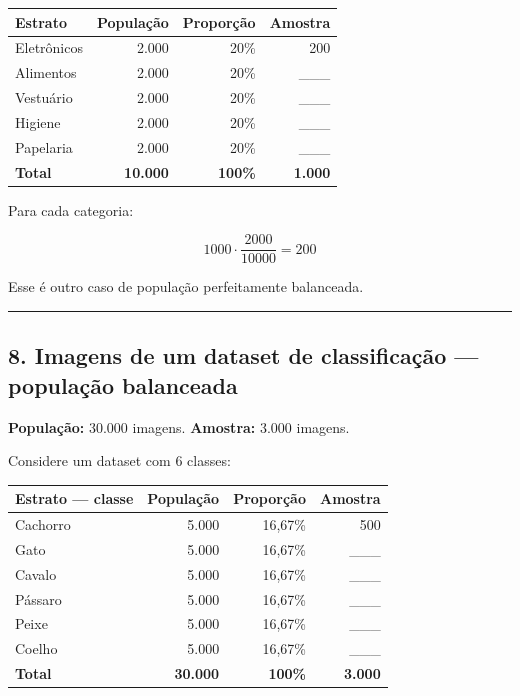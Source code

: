\documentclass[
]{book}
\begin{document}
\begin{longtable}[]{@{}lrrr@{}}
\toprule\noalign{}
Estrato & População & Proporção & Amostra \\
\midrule\noalign{}
\endhead
\bottomrule\noalign{}
\endlastfoot
Eletrônicos & 2.000 & 20\% & 200 \\
Alimentos & 2.000 & 20\% & \_\_\_ \\
Vestuário & 2.000 & 20\% & \_\_\_ \\
Higiene & 2.000 & 20\% & \_\_\_ \\
Papelaria & 2.000 & 20\% & \_\_\_ \\
\textbf{Total} & \textbf{10.000} & \textbf{100\%} & \textbf{1.000} \\
\end{longtable}

Para cada categoria:

\[
1000\cdot\frac{2000}{10000}=200
\]

Esse é outro caso de população perfeitamente balanceada.

\begin{center}\rule{0.5\linewidth}{0.5pt}\end{center}

\subsection{8. Imagens de um dataset de classificação --- população balanceada}\label{imagens-de-um-dataset-de-classificauxe7uxe3o-populauxe7uxe3o-balanceada}

\textbf{População:} 30.000 imagens.
\textbf{Amostra:} 3.000 imagens.

Considere um dataset com 6 classes:

\begin{longtable}[]{@{}lrrr@{}}
\toprule\noalign{}
Estrato --- classe & População & Proporção & Amostra \\
\midrule\noalign{}
\endhead
\bottomrule\noalign{}
\endlastfoot
Cachorro & 5.000 & 16,67\% & 500 \\
Gato & 5.000 & 16,67\% & \_\_\_ \\
Cavalo & 5.000 & 16,67\% & \_\_\_ \\
Pássaro & 5.000 & 16,67\% & \_\_\_ \\
Peixe & 5.000 & 16,67\% & \_\_\_ \\
Coelho & 5.000 & 16,67\% & \_\_\_ \\
\textbf{Total} & \textbf{30.000} & \textbf{100\%} & \textbf{3.000} \\
\end{longtable}
\end{document}
